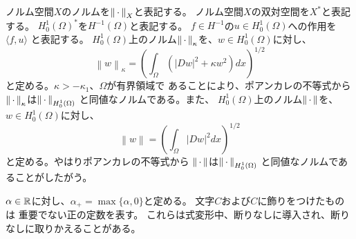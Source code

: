 ノルム空間$X$のノルムを$\left\|\, \cdot \, \right\|_X$と表記する。
ノルム空間$X$の双対空間を$X^*$と表記する。
$H_0^1(\Omega)^*$を$H^{-1}(\Omega)$と表記する。
$f \in H^{-1}$の$u \in H_0^1(\Omega)$への作用を$\langle f, u \rangle$
と表記する。
$H_0^1(\Omega)$上のノルム$\left\|\, \cdot \, \right\|_{\kappa}$を、$w \in H_0^1(\Omega)$に対し、
\[
 \left\| w \right\|_\kappa = \left(\int_\Omega \left( \lvert Dw \rvert^2 +
 \kappa w ^2 \right) dx\right)^{1/2}
\]
と定める。$\kappa > -\kappa_1$、$\Omega$が有界領域で
あることにより、ポアンカレの不等式から
$\left\|\, \cdot \, \right\|_\kappa$は$\left\|\, \cdot \, \right\|_{H_0^1(\Omega)}$
と同値なノルムである。また、
$H_0^1(\Omega)$上のノルム$\left\|\, \cdot \, \right\|$を、$w \in H_0^1(\Omega)$に対し、
\[
 \left\| w \right\| = \left(\int_\Omega \lvert Dw \rvert^2 dx\right)^{1/2}
\]
と定める。やはりポアンカレの不等式から
$\left\|\, \cdot \, \right\|$は$\left\|\, \cdot \, \right\|_{H_0^1(\Omega)}$
と同値なノルムであることがしたがう。

$\alpha \in \mathbb{R}$に対し、$\alpha_+ = \max \{ \alpha, 0 \}$と定める。
文字$C$および$C$に飾りをつけたものは
重要でない正の定数を表す。
これらは式変形中、断りなしに導入され、断りなしに取りかえることがある。

